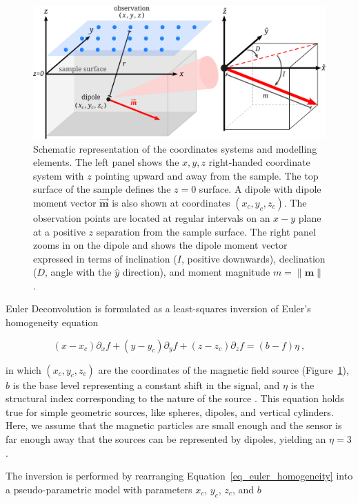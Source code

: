 \begin{figure}[tb]
\centering
\includegraphics[width=\linewidth]{figures/coordinate-system-sketch.png}
\caption{
Schematic representation of the coordinates systems and modelling elements.
The left panel shows the $x, y, z$ right-handed coordinate system with $z$
pointing upward and away from the sample. The top surface of the sample defines
the $z=0$ surface. A dipole with dipole moment vector $\mathbf{\vec{m}}$ is
also shown at coordinates $(x_c, y_c, z_c)$. The observation points are located
at regular intervals on an $x-y$ plane at a positive $z$ separation from the
sample surface. The right panel zooms in on the dipole and shows the dipole
moment vector expressed in terms of inclination ($I$, positive downwards),
declination ($D$, angle with the $\hat{y}$ direction), and moment magnitude $m
= \|\mathbf{m}\|$.
}
\label{fig_coordinate_systems}
\end{figure}

Euler Deconvolution is formulated as a least-squares inversion of Euler's
homogeneity equation

\begin{equation}
\label{eq_euler_homogeneity}
(x - x_c)\partial_x f
+ (y - y_c)\partial_y f
+ (z - z_c)\partial_z f
= (b - f)\eta
\ ,
\end{equation}

\noindent
in which $(x_c, y_c, z_c)$ are the coordinates of the magnetic field source
(Figure~\ref{fig_coordinate_systems}), $b$ is the base level representing a
constant shift in the signal, and $\eta$ is the structural index corresponding
to the nature of the source \citep{Reid1990}. This equation holds true for
simple geometric sources, like spheres, dipoles, and vertical cylinders. Here,
we assume that the magnetic particles are small enough and the sensor is far
enough away that the sources can be represented by dipoles, yielding an
$\eta=3$.

The inversion is performed by rearranging Equation~\ref{eq_euler_homogeneity}
into a pseudo-parametric model with parameters $x_c$, $y_c$, $z_c$, and $b$

